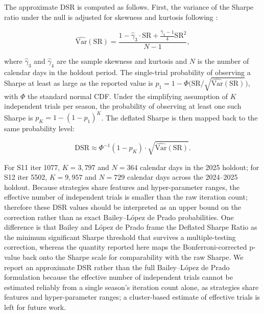 \documentclass[analytics,article,submit,pdftex,moreauthors]{Definitions/mdpi}
\begin{document}
The approximate DSR is computed as follows. First, the variance of the Sharpe ratio under the null is adjusted for skewness and kurtosis following \citep{lo_2002}:

\[\widehat{\mathrm{Var}}(\mathrm{SR}) = \frac{1 - \hat{\gamma}_3 \cdot \mathrm{SR} + \frac{\hat{\gamma}_4 - 1}{4} \mathrm{SR}^2}{N - 1},\]

where \(\hat{\gamma}_3\) and \(\hat{\gamma}_4\) are the sample skewness and kurtosis and \(N\) is the number of calendar days in the holdout period. The single-trial probability of observing a Sharpe at least as large as the reported value is \(p_1 = 1 - \Phi\big(\mathrm{SR} / \sqrt{\widehat{\mathrm{Var}}(\mathrm{SR})}\big)\), with \(\Phi\) the standard normal CDF. Under the simplifying assumption of \(K\) independent trials per season, the probability of observing at least one such Sharpe is \(p_K = 1 - (1 - p_1)^K\). The deflated Sharpe is then mapped back to the same probability level:

\[\mathrm{DSR} \approx \Phi^{-1}(1 - p_K) \cdot \sqrt{\widehat{\mathrm{Var}}(\mathrm{SR})}.\]

For S11 iter 1077, \(K = 3,797\) and \(N = 364\) calendar days in the 2025 holdout; for S12 iter 5502, \(K = 9,957\) and \(N = 729\) calendar days across the 2024--2025 holdout. Because strategies share features and hyper-parameter ranges, the effective number of independent trials is smaller than the raw iteration count; therefore these DSR values should be interpreted as an upper bound on the correction rather than as exact Bailey--López de Prado probabilities. One difference is that Bailey and López de Prado \citep{bailey_2014} frame the Deflated Sharpe Ratio as the minimum significant Sharpe threshold that survives a multiple-testing correction, whereas the quantity reported here maps the Bonferroni-corrected p-value back onto the Sharpe scale for comparability with the raw Sharpe. We report an approximate DSR rather than the full Bailey--López de Prado \citep{bailey_2014} formulation because the effective number of independent trials cannot be estimated reliably from a single season's iteration count alone, as strategies share features and hyper-parameter ranges; a cluster-based estimate of effective trials is left for future work.
\end{document}
